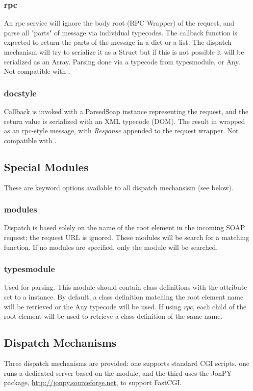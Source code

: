 \subsubsection{rpc} An rpc service will ignore the body root (RPC Wrapper) of
the request, and parse all "parts" of message via individual typecodes.  The
callback function is expected to return the parts of the message in a dict or a
list.  The dispatch mechanism will try to serialize it as a Struct but if this
is not possible it will be serialized as an Array. Parsing done via a typecode
from typesmodule, or Any.  Not compatible with .

\subsubsection{docstyle}  Callback is invoked with a ParsedSoap instance
representing the request, and the return value is serialized with an XML
typecode (DOM).  The result in wrapped as an rpc-style message, with
\emph{Response} appended to the request wrapper.  Not compatible with .

\subsection{Special Modules}  These are keyword options available to all
dispatch mechansism (see below).

\subsubsection{modules}{Dispatch is based solely on the name of the root element in the
incoming SOAP request; the request URL is ignored.  These modules will be search
for a matching function.  If no modules are specified, only the
 module will be searched.}

\subsubsection{typesmodule}{Used for parsing.  This module should contain class
definitions with the  attribute set to a 
instance.  By default, a class definition matching the root element name will be
retrieved or the Any typecode will be used.  If using \emph{rpc}, each child of
the root element will be used to retrieve a class definition of the same name.}

\subsection{Dispatch Mechanisms}
Three dispatch mechanisms are provided: one supports standard CGI
scripts, one runs a dedicated server based on the
 module, and the third uses the JonPY package,
\url{http://jonpy.sourceforge.net}, to support FastCGI.

